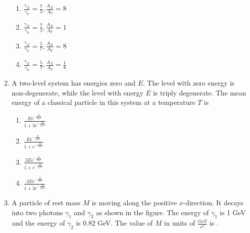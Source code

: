 \documentclass{article}
\begin{document}
\begin{enumerate}
    \begin{enumerate}
        \item $\frac{\gamma_X}{\gamma_Y} = \frac{7}{5}, \frac{A_X}{A_Y} = 8$
        \item $\frac{\gamma_X}{\gamma_Y} = \frac{7}{5}, \frac{A_X}{A_Y} = 1$
        \item $\frac{\gamma_X}{\gamma_Y} = \frac{5}{7}, \frac{A_X}{A_Y} = 8$
        \item $\frac{\gamma_X}{\gamma_Y} = \frac{5}{7}, \frac{A_X}{A_Y} = \frac{1}{8}$
    \end{enumerate}

    \item A two-level system has energies zero and $E$. The level with zero energy is non-degenerate, while the level with energy $E$ is triply degenerate. The mean energy of a classical particle in this system at a temperature $T$ is  


    \begin{enumerate}
        \item $\frac{Ee^{-\frac{E}{k_BT}}}{1+3e^{-\frac{E}{k_BT}}}$
        \item $\frac{Ee^{-\frac{E}{k_BT}}}{1+e^{-\frac{E}{k_BT}}}$
        \item $\frac{3Ee^{-\frac{E}{k_BT}}}{1+e^{-\frac{E}{k_BT}}}$
        \item $\frac{3Ee^{-\frac{E}{k_BT}}}{1+3e^{-\frac{E}{k_BT}}}$
    \end{enumerate}

 \item A particle of rest mass $M$ is moving along the positive $x$-direction. It decays into two photons $\gamma_1$ and $\gamma_2$ as shown in the figure. The energy of $\gamma_1$ is 1 GeV and the energy of $\gamma_2$ is 0.82 GeV. The value of $M$ in units of $\frac{GeV}{{c}^2}$ is  
 \underline{\hspace{2cm}}.

\begin{figure}[!ht]
\centering
{}%


\end{figure}
\end{enumerate}
\end{document}
